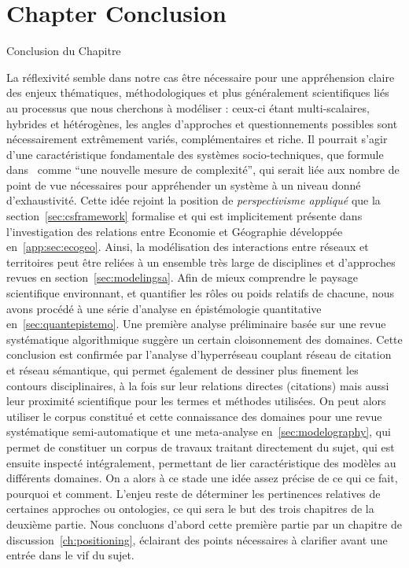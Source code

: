



\newpage


\section*{Chapter Conclusion}{Conclusion du Chapitre}

La réflexivité semble dans notre cas être nécessaire pour une appréhension claire des enjeux thématiques, méthodologiques et plus généralement scientifiques liés au processus que nous cherchons à modéliser : ceux-ci étant multi-scalaires, hybrides et hétérogènes, les angles d'approches et questionnements possibles sont nécessairement extrêmement variés, complémentaires et riche. Il pourrait s'agir d'une caractéristique fondamentale des systèmes socio-techniques, que  formule dans~\cite{pumain2003approche} comme ``une nouvelle mesure de complexité'', qui serait liée aux nombre de point de vue nécessaires pour appréhender un système à un niveau donné d'exhaustivité. Cette idée rejoint la position de \emph{perspectivisme appliqué} que la section~\ref{sec:csframework} formalise et qui est implicitement présente dans l'investigation des relations entre Economie et Géographie développée en~\ref{app:sec:ecogeo}. Ainsi, la modélisation des interactions entre réseaux et territoires peut être reliées à un ensemble très large de disciplines et d'approches revues en section~\ref{sec:modelingsa}. Afin de mieux comprendre le paysage scientifique environnant, et quantifier les rôles ou poids relatifs de chacune, nous avons procédé à une série d'analyse en épistémologie quantitative en~\ref{sec:quantepistemo}. Une première analyse préliminaire basée sur une revue systématique algorithmique suggère un certain cloisonnement des domaines. Cette conclusion est confirmée par l'analyse d'hyperréseau couplant réseau de citation et réseau sémantique, qui permet également de dessiner plus finement les contours disciplinaires, à la fois sur leur relations directes (citations) mais aussi leur proximité scientifique pour les termes et méthodes utilisées. On peut alors utiliser le corpus constitué et cette connaissance des domaines pour une revue systématique semi-automatique et une meta-analyse en~\ref{sec:modelography}, qui permet de constituer un corpus de travaux traitant directement du sujet, qui est ensuite inspecté intégralement, permettant de lier caractéristique des modèles au différents domaines. On a alors à ce stade une idée assez précise de ce qui ce fait, pourquoi et comment. L'enjeu reste de déterminer les pertinences relatives de certaines approches ou ontologies, ce qui sera le but des trois chapitres de la deuxième partie. Nous concluons d'abord cette première partie par un chapitre de discussion~\ref{ch:positioning}, éclairant des points nécessaires à clarifier avant une entrée dans le vif du sujet.






\stars

